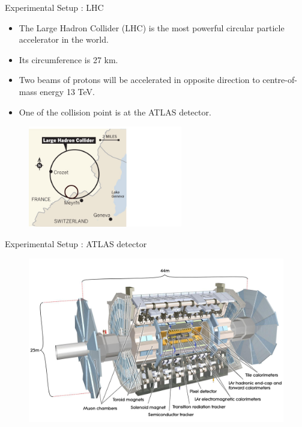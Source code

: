 \documentclass[mathserif,serif]{beamer}
\begin{document}
\begin{frame}{Experimental Setup : LHC}
\begin{itemize}
\item The Large Hadron Collider (LHC) is the most powerful circular particle accelerator in the world.
\item Its circumference is 27 km.
\item Two beams of protons will be accelerated in opposite direction to centre-of-mass energy 13 TeV.
\item One of the collision point is at the ATLAS detector.
\end{itemize}
\begin{figure}
\centering
\includegraphics[width=0.6\textwidth]{data/photo/detector/LHC.jpg}
\end{figure}
\end{frame}

\begin{frame}{Experimental Setup : ATLAS detector}
\begin{figure}
\centering
\includegraphics[width=\textwidth]{data/photo/detector/ATLAS.jpg}
\end{figure}
\end{frame}
\end{document}
